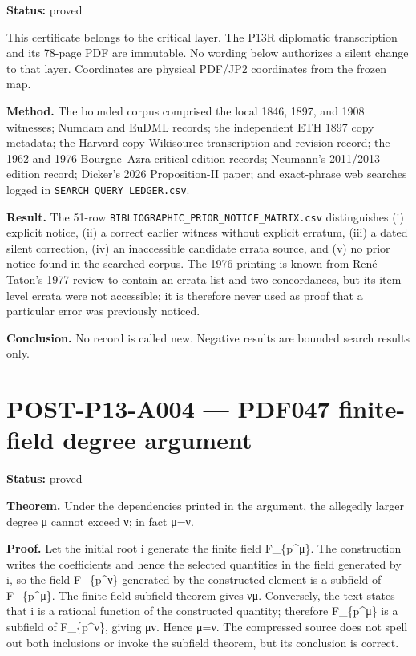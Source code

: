 \documentclass[
  10pt,
  a4paper,
]{scrreprt}
\begin{document}
\textbf{Status:} proved

This certificate belongs to the critical layer. The P13R diplomatic
transcription and its 78-page PDF are immutable. No wording below
authorizes a silent change to that layer. Coordinates are physical
PDF/JP2 coordinates from the frozen map.

\textbf{Method.} The bounded corpus comprised the local 1846, 1897, and
1908 witnesses; Numdam and EuDML records; the independent ETH 1897 copy
metadata; the Harvard-copy Wikisource transcription and revision record;
the 1962 and 1976 Bourgne--Azra critical-edition records; Neumann's
2011/2013 edition record; Dicker's 2026 Proposition-II paper; and
exact-phrase web searches logged in \texttt{SEARCH\_QUERY\_LEDGER.csv}.

\textbf{Result.} The 51-row
\texttt{BIBLIOGRAPHIC\_PRIOR\_NOTICE\_MATRIX.csv} distinguishes (i)
explicit notice, (ii) a correct earlier witness without explicit
erratum, (iii) a dated silent correction, (iv) an inaccessible candidate
errata source, and (v) no prior notice found in the searched corpus. The
1976 printing is known from René Taton's 1977 review to contain an
errata list and two concordances, but its item-level errata were not
accessible; it is therefore never used as proof that a particular error
was previously noticed.

\textbf{Conclusion.} No record is called new. Negative results are
bounded search results only.

\section{POST-P13-A004 --- PDF047 finite-field degree
argument}\label{post-p13-a004-pdf047-finite-field-degree-argument}

\textbf{Status:} proved

\textbf{Theorem.} Under the dependencies printed in the argument, the
allegedly larger degree μ cannot exceed ν; in fact μ=ν.

\textbf{Proof.} Let the initial root i generate the finite field
F\_\{p\^{}μ\}. The construction writes the coefficients and hence the
selected quantities in the field generated by i, so the field
F\_\{p\^{}ν\} generated by the constructed element is a subfield of
F\_\{p\^{}μ\}. The finite-field subfield theorem gives ν\textbar μ.
Conversely, the text states that i is a rational function of the
constructed quantity; therefore F\_\{p\^{}μ\} is a subfield of
F\_\{p\^{}ν\}, giving μ\textbar ν. Hence μ=ν. The compressed source does
not spell out both inclusions or invoke the subfield theorem, but its
conclusion is correct.
\end{document}
